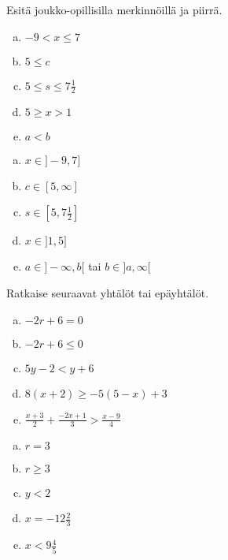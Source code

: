 \begin{tehtava}
    Esitä joukko-opillisilla merkinnöillä ja piirrä.
    \begin{enumerate}[a)]
        \item $-9<x \leq 7$
        \item $5\leq c$
        \item $5\leq s \leq 7\frac{1}{2}$
        \item $5\geq x>1$
        \item $a<b$
    \end{enumerate}
    \begin{vastaus}
        \begin{enumerate}[a)]
            \item $x \in ]-9,7]$
            \item $c \in [5,\infty]$
            \item $s \in [5,7\frac{1}{2}]$
            \item $x \in ]1,5]$
            \item $a \in ]-\infty,b[$ \quad tai \quad $b \in ]a, \infty[$
        \end{enumerate}
    \end{vastaus}
\end{tehtava}

\begin{tehtava}
    Ratkaise seuraavat yhtälöt tai epäyhtälöt.
    \begin{enumerate}[a)]
        \item $-2r+6=0$
        \item $-2r+6\leq 0$
        \item $5y-2<y+6$
        \item $8(x+2)\geq -5(5-x)+3$
        \item $\frac{x+3}{2}+\frac{-2x+1}{3}>\frac{x-9}{4}$
    \end{enumerate}
    \begin{vastaus}
        \begin{enumerate}[a)]
            \item $r=3$
            \item $r\geq 3$
            \item $y<2$
            \item $x=-12\frac{2}{3}$
            \item $x<9\frac{4}{5}$
        \end{enumerate}
    \end{vastaus}
\end{tehtava}

